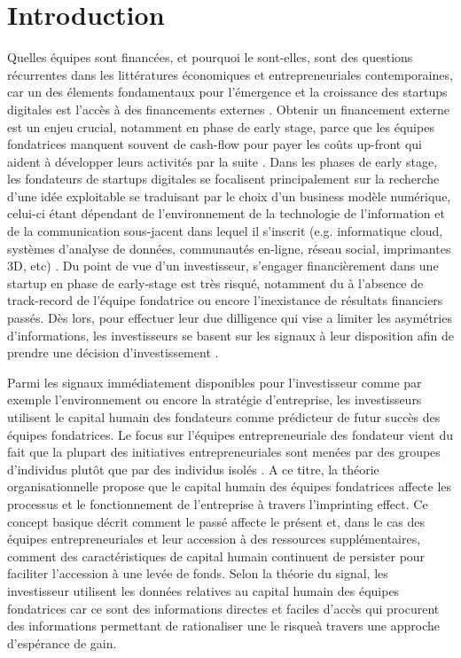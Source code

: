 \documentclass[11pt]{article}
\begin{document}
\clearpage
\section{Introduction}

Quelles équipes sont financées, et pourquoi le sont-elles, sont des questions récurrentes dans les littératures économiques et entrepreneuriales contemporaines, car un des élements fondamentaux pour l'émergence et la croissance des startups digitales est l'accès à des financements externes \citep{ratzinger2018impact, klein2020start}. Obtenir un financement externe est un enjeu crucial, notamment en phase de early stage, parce que les équipes fondatrices manquent souvent de cash-flow pour payer les coûts up-front qui aident à développer leurs activités par la suite \citep{ratzinger2018impact}. Dans les phases de early stage, les fondateurs de startups digitales se focalisent principalement sur la recherche d'une idée exploitable se traduisant par le choix d'un business modèle numérique, celui-ci étant dépendant de l'environnement de la technologie de l’information et de la communication sous-jacent dans lequel il s'inscrit (e.g. informatique cloud, systèmes d’analyse de données, communautés en-ligne, réseau social, imprimantes 3D, etc) \citep{nambisan2017digital}. Du point de vue d'un investisseur, s'engager financièrement dans une startup en phase de early-stage est très risqué, notamment du à l'absence de track-record de l'équipe fondatrice ou encore l'inexistance de résultats financiers passés. Dès lors, pour effectuer leur due dilligence qui vise a limiter les asymétries d'informations, les investisseurs se basent sur les signaux à leur disposition afin de prendre une décision d'investissement \citep{colombo2021use, ko2018signaling, spence1974market}.

Parmi les signaux immédiatement disponibles pour l'investisseur comme par exemple l'environnement ou encore la stratégie d'entreprise, les investisseurs utilisent le capital humain des fondateurs comme prédicteur de futur succès des équipes fondatrices. Le focus sur l'équipes entrepreneuriale des fondateur vient du fait que la plupart des initiatives entrepreneuriales sont menées par des groupes d'individus plutôt que par des individus isolés \citep{roure1990predictors, klotz2014new}. A ce titre, la théorie organisationnelle propose que le capital humain des équipes fondatrices affecte les processus et le fonctionnement de l'entreprise à travers l'imprinting effect. Ce concept basique décrit comment le passé affecte le présent et, dans le cas des équipes entrepreneuriales et leur accession à des ressources supplémentaires, comment des caractéristiques de capital humain continuent de persister pour faciliter l'accession à une levée de fonds. Selon la théorie du signal, les investisseur utilisent les données relatives au capital humain des équipes fondatrices car ce sont des informations directes et faciles d'accès qui procurent des informations permettant de rationaliser une le risqueà travers une approche d'espérance de gain.
\end{document}
